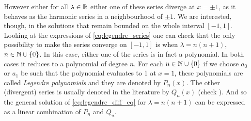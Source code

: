 \documentclass[../main.tex]{subfiles}
\begin{document}
However either for all $\lambda\in\mathbb{R}$ either one of these series diverge at $x=\pm 1$, as it behaves as the harmonic series in a neighbourhood of $\pm 1$. We are interested, though, in the solutions that remain bounded on the whole interval $[-1,1]$. Looking at the expressions of \cref{eq:legendre_series} one can check that the only possibility to make the series converge on $[-1,1]$ is when $\lambda =n(n+1)$, $n\in\mathbb{N}\cup\{0\}$. In this case, either one of the series is in fact a polynomial. In both cases it reduces to a polynomial of degree $n$. For each $n\in\mathbb{N}\cup\{0\}$ if we choose $a_0$ or $a_1$ be such that the polynomial evaluates to 1 at $x=1$, these polynomials are called \emph{Legendre polynomials} and they are denoted by $P_n(x)$. The other (divergent) series is usually denoted in the literature by $Q_n(x)$ (check \cite{mathematical_methods}). And so the general solution of \cref{eq:legendre_diff_eq} for $\lambda=n(n+1)$ can be expressed as a linear combination of $P_n$ and $Q_n$.
\end{document}
